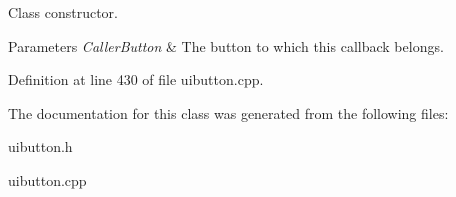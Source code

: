 Class constructor. 


\begin{DoxyParams}{Parameters}
{\em CallerButton} & The button to which this callback belongs. \\
\hline
\end{DoxyParams}


Definition at line 430 of file uibutton.cpp.



The documentation for this class was generated from the following files:\begin{DoxyCompactItemize}
\item 
uibutton.h\item 
uibutton.cpp\end{DoxyCompactItemize}
